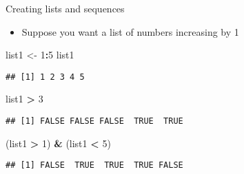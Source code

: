 \documentclass[ignorenonframetext,]{beamer}
\newenvironment{Shaded}{\begin{snugshade}}{\end{snugshade}}
\newcommand{\DecValTok}[1]{\textcolor[rgb]{0.00,0.00,0.81}{#1}}
\newcommand{\StringTok}[1]{\textcolor[rgb]{0.31,0.60,0.02}{#1}}
\newcommand{\OperatorTok}[1]{\textcolor[rgb]{0.81,0.36,0.00}{\textbf{#1}}}
\newcommand{\NormalTok}[1]{#1}
\providecommand{\tightlist}{%
	\setlength{\itemsep}{0pt}\setlength{\parskip}{0pt}}
\begin{document}
\begin{frame}[fragile]{Creating lists and sequences}

\begin{itemize}
\tightlist
\item
  Suppose you want a list of numbers increasing by 1
\end{itemize}

\begin{Shaded}
\begin{Highlighting}[]
\NormalTok{list1 <-}\StringTok{ }\DecValTok{1}\OperatorTok{:}\DecValTok{5}
\NormalTok{list1}
\end{Highlighting}
\end{Shaded}

\begin{verbatim}
## [1] 1 2 3 4 5
\end{verbatim}

\begin{Shaded}
\begin{Highlighting}[]
\NormalTok{list1 }\OperatorTok{>}\StringTok{ }\DecValTok{3}
\end{Highlighting}
\end{Shaded}

\begin{verbatim}
## [1] FALSE FALSE FALSE  TRUE  TRUE
\end{verbatim}

\begin{Shaded}
\begin{Highlighting}[]
\NormalTok{(list1 }\OperatorTok{>}\StringTok{ }\DecValTok{1}\NormalTok{) }\OperatorTok{&}\StringTok{ }\NormalTok{(list1 }\OperatorTok{<}\StringTok{ }\DecValTok{5}\NormalTok{)}
\end{Highlighting}
\end{Shaded}

\begin{verbatim}
## [1] FALSE  TRUE  TRUE  TRUE FALSE
\end{verbatim}

\end{frame}
\end{document}
